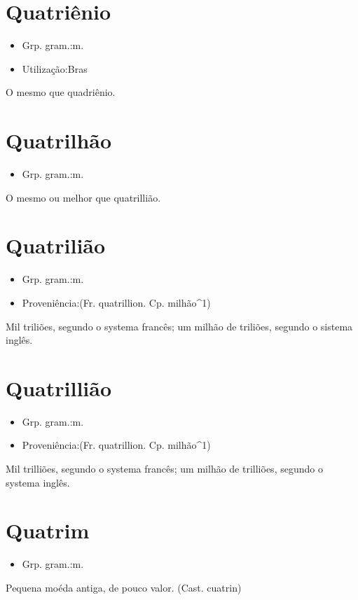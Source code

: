 \section{Quatriênio}
\begin{itemize}
\item {Grp. gram.:m.}
\end{itemize}
\begin{itemize}
\item {Utilização:Bras}
\end{itemize}
O mesmo que \textunderscore quadriênio\textunderscore .
\section{Quatrilhão}
\begin{itemize}
\item {Grp. gram.:m.}
\end{itemize}
O mesmo ou melhor que \textunderscore quatrillião\textunderscore .
\section{Quatrilião}
\begin{itemize}
\item {Grp. gram.:m.}
\end{itemize}
\begin{itemize}
\item {Proveniência:(Fr. \textunderscore quatrillion\textunderscore . Cp. \textunderscore milhão\textunderscore ^1)}
\end{itemize}
Mil triliões, segundo o systema francês; um milhão de triliões, segundo o sistema inglês.
\section{Quatrillião}
\begin{itemize}
\item {Grp. gram.:m.}
\end{itemize}
\begin{itemize}
\item {Proveniência:(Fr. \textunderscore quatrillion\textunderscore . Cp. \textunderscore milhão\textunderscore ^1)}
\end{itemize}
Mil trilliões, segundo o systema francês; um milhão de trilliões, segundo o systema inglês.
\section{Quatrim}
\begin{itemize}
\item {Grp. gram.:m.}
\end{itemize}
Pequena moéda antiga, de pouco valor.
(Cast. \textunderscore cuatrin\textunderscore )
